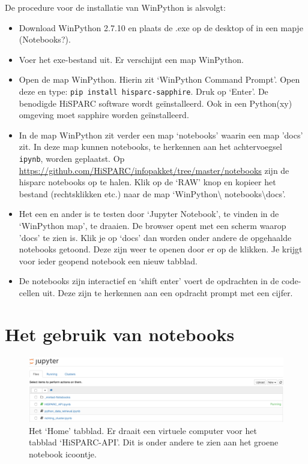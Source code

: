 De procedure voor de installatie van WinPython is alsvolgt:
\begin{itemize}
\item Download WinPython 2.7.10 en plaats de .exe op de desktop of in een mapje (Notebooks?).
\item Voer het exe-bestand uit. Er verschijnt een map WinPython.
\item Open de map WinPython. Hierin zit `WinPython Command Prompt'. Open deze en type:
 {\tt pip install hisparc-sapphire}. Druk op `Enter'. De benodigde HiSPARC software wordt ge\"{i}nstalleerd.
 Ook in een Python(xy) omgeving moet sapphire worden ge\"{i}nstalleerd.
\item In de map WinPython zit verder een map `notebooks' waarin een map 'docs' zit. In deze map kunnen notebooks,
te herkennen aan het achtervoegsel {\tt ipynb}, worden geplaatst.
Op \url{https://github.com/HiSPARC/infopakket/tree/master/notebooks} zijn de hisparc notebooks op te halen. Klik
op de `RAW' knop en kopieer het bestand (rechtsklikken etc.) naar de map `WinPython\textbackslash
notebooks\textbackslash docs'.
\item Het een en ander is te testen door `Jupyter Notebook', te vinden in de `WinPython map', te draaien. De browser
opent met een scherm waarop 'docs' te zien is. Klik je op `docs' dan worden onder andere de opgehaalde notebooks
getoond. Deze zijn weer te openen door er op de klikken. Je krijgt voor ieder geopend notebook een nieuw tabblad.
\item De notebooks zijn interactief en `shift enter' voert de opdrachten in de code-cellen uit. Deze zijn te herkennen aan
een opdracht prompt met een cijfer.
\end{itemize}

\section{Het gebruik van notebooks}

\begin{figure}[H]
\includegraphics[width=16cm]{home.png}
\caption{Het `Home' tabblad. Er draait een virtuele computer voor het tabblad `HiSPARC-API'. Dit is onder andere te zien
aan het groene notebook icoontje.}
\end{figure}

